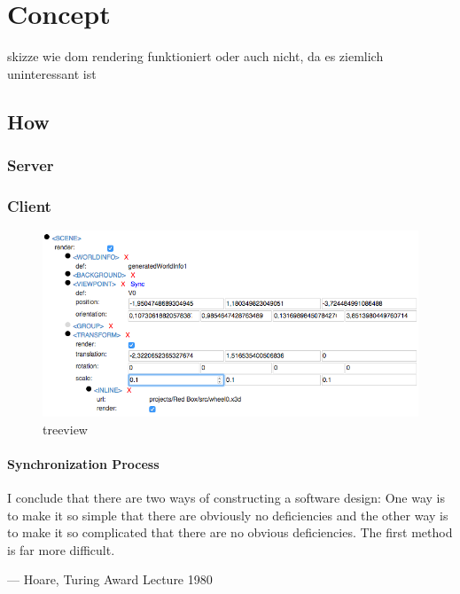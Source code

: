 
\section{Concept}\label{concept}

skizze wie dom rendering funktioniert oder auch nicht, da es ziemlich
uninteressant ist

\subsection{How}\label{how}

\subsubsection{Server}\label{server}

\subsubsection{Client}\label{client}

\begin{figure}[htbp]
  \centering
  \includegraphics[width=12cm]{../assets/treeview.png}
  \caption{treeview}
  \label{fig:tree-view}
\end{figure}

\clearpage
\paragraph{Synchronization Process}\label{synchronization-process}

\epigraph{I conclude that there are two ways of constructing a software design:
One way is to make it so simple that there are obviously no deficiencies
and the other way is to make it so complicated that there are no obvious
deficiencies. The first method is far more difficult.}{--- Hoare, Turing Award Lecture 1980}

